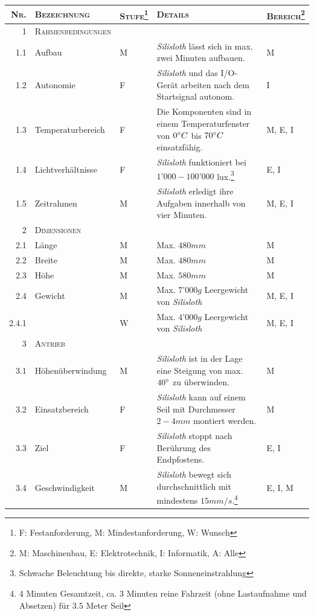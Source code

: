 \documentclass[a4paper,11pt]{scrartcl}
\begin{document}
\renewcommand*{\arraystretch}{1.2}
\begin{longtable}{|r|l|l|p{7cm}|l|}
\hline
\textsc{Nr.} & \textsc{Bezeichnung} & \textsc{Stufe\footnote{F: Festanforderung, M: Mindestanforderung, W: Wunsch}} & \textsc{Details} & \textsc{Bereich\footnote{M: Maschinenbau, E: Elektrotechnik, I: Informatik, A: Alle}} \\
\hline
\textsc{1} & \textsc{Rahmenbedingungen}  & & & \\
1.1 & Aufbau & M & \textit{Silisloth} lässt sich in max. zwei Minuten aufbauen. & M \\
1.2 & Autonomie & F & \textit{Silisloth} und das I/O-Gerät arbeiten nach dem Startsignal autonom. & I \\
1.3 & Temperaturbereich & F & Die Komponenten sind in einem Temperaturfenster von $0\degree C$ bis $70\degree C$ einsatzfähig. & M, E, I \\
1.4 & Lichtverhältnisse & F & \textit{Silisloth} funktioniert bei $1’000-100’000$ lux.\footnote{Schwache Beleuchtung bis direkte, starke Sonneneinstrahlung} & E, I \\
1.5 & Zeitrahmen & M & \textit{Silisloth} erledigt ihre Aufgaben innerhalb von vier Minuten. & M, E, I \\
\textsc{2} & \textsc{Dimensionen} & & & \\
2.1 & Länge & M & Max. $480mm$ & M \\
2.2 & Breite & M & Max. $480mm$ & M \\
2.3 & Höhe & M & Max. $580mm$ & M \\
2.4 & Gewicht & M & Max. $7’000g$ Leergewicht von \textit{Silisloth} & M, E, I \\
2.4.1 & & W & Max. $4’000g$ Leergewicht von \textit{Silisloth} & M, E, I \\
\textsc{3} & \textsc{Antrieb} & & & \\
3.1 & Höhenüberwindung & M & \textit{Silisloth} ist in der Lage eine Steigung von max. $40\degree$ zu überwinden. & M \\
3.2 & Einsatzbereich & F & \textit{Silisloth} kann auf einem Seil mit Durchmesser $2-4mm$ montiert werden. & M \\
3.3 & Ziel & F & \textit{Silisloth} stoppt nach Berührung des Endpfostens. & E, I \\
3.4 & Geschwindigkeit & M & \textit{Silisloth} bewegt sich durchschnittlich mit mindestens $15mm/s$.\footnote{4 Minuten Gesamtzeit, ca. $3$ Minuten reine Fahrzeit (ohne Lastaufnahme und Absetzen) für $3.5$ Meter Seil} & E, I, M \\

\end{longtable}
\end{document}
